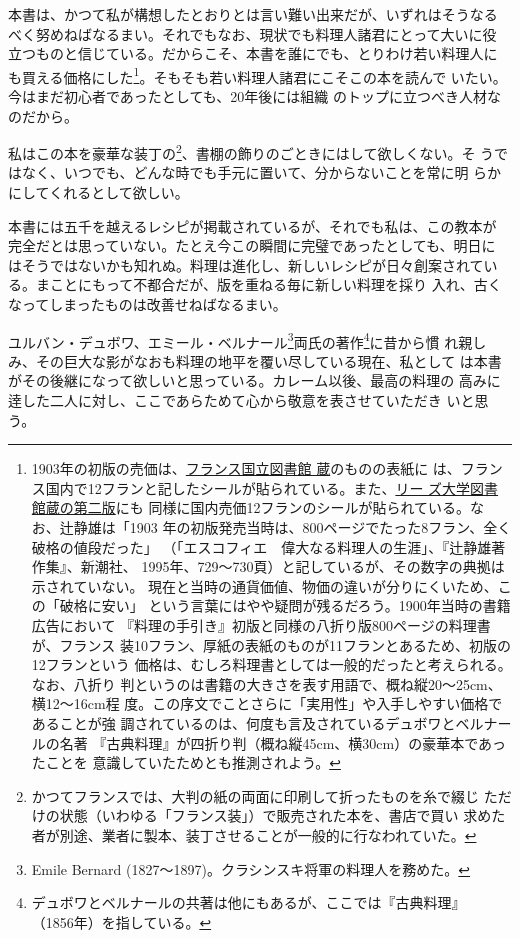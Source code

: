 本書は、かつて私が構想したとおりとは言い難い出来だが、いずれはそうなる
べく努めねばなるまい。それでもなお、現状でも料理人諸君にとって大いに役
立つものと信じている。だからこそ、本書を誰にでも、とりわけ若い料理人に
も買える価格にした\footnote{1903年の初版の売価は、\href{http://gallica.bnf.fr/ark:/12148/bpt6k65768837}{フランス国立図書館
  蔵}のものの表紙に
  は、フランス国内で12フランと記したシールが貼られている。また、\href{https://archive.org/details/b21525912}{リー
  ズ大学図書館蔵の第二版}にも
  同様に国内売価12フランのシールが貼られている。なお、辻静雄は「1903
  年の初版発売当時は、800ページでたった8フラン、全く破格の値段だった」
  （「エスコフィエ　偉大なる料理人の生涯」、『辻静雄著作集』、新潮社、
  1995年、729〜730頁）と記しているが、その数字の典拠は示されていない。
  現在と当時の通貨価値、物価の違いが分りにくいため、この「破格に安い」
  という言葉にはやや疑問が残るだろう。1900年当時の書籍広告において
  『料理の手引き』初版と同様の八折り版800ページの料理書が、フランス
  装10フラン、厚紙の表紙のものが11フランとあるため、初版の12フランという
  価格は、むしろ料理書としては一般的だったと考えられる。なお、八折り
  判というのは書籍の大きさを表す用語で、概ね縦20〜25cm、横12〜16cm程
  度。この序文でことさらに「実用性」や入手しやすい価格であることが強
  調されているのは、何度も言及されているデュボワとベルナールの名著
  『古典料理』が四折り判（概ね縦45cm、横30cm）の豪華本であったことを
  意識していたためとも推測されよう。}。そもそも若い料理人諸君にこそこの本を読んで
いたい。今はまだ初心者であったとしても、20年後には組織
のトップに立つべき人材なのだから。

私はこの本を豪華な装丁の\footnote{かつてフランスでは、大判の紙の両面に印刷して折ったものを糸で綴じ
  ただけの状態（いわゆる「フランス装」）で販売された本を、書店で買い
  求めた者が別途、業者に製本、装丁させることが一般的に行なわれていた。}、書棚の飾りのごときにはして欲しくない。そ
うではなく、いつでも、どんな時でも手元に置いて、分からないことを常に明
らかにしてくれるとして欲しい。

本書には五千を越えるレシピが掲載されているが、それでも私は、この教本が
完全だとは思っていない。たとえ今この瞬間に完璧であったとしても、明日に
はそうではないかも知れぬ。料理は進化し、新しいレシピが日々創案されてい
る。まことにもって不都合だが、版を重ねる毎に新しい料理を採り
入れ、古くなってしまったものは改善せねばなるまい。

ユルバン・デュボワ、エミール・ベルナール\footnote{Emile Bernard
  (1827〜1897)。クラシンスキ将軍の料理人を務めた。}両氏の著作\footnote{デュボワとベルナールの共著は他にもあるが、ここでは『古典料理』
  （1856年）を指している。}に昔から慣
れ親しみ、その巨大な影がなおも料理の地平を覆い尽している現在、私として
は本書がその後継になって欲しいと思っている。カレーム以後、最高の料理の
高みに逹した二人に対し、ここであらためて心から敬意を表させていただき
いと思う。

